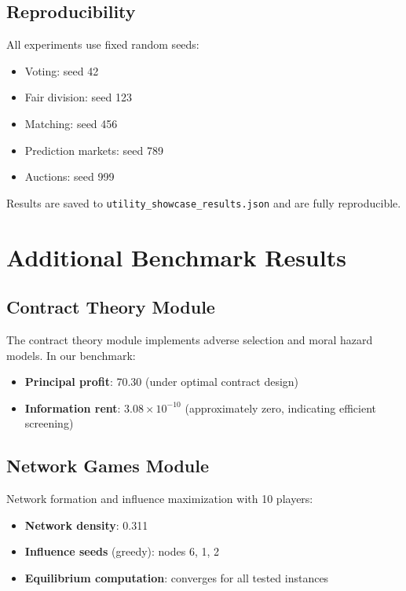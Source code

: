 \documentclass[10pt]{article}
\begin{document}
\subsection{Reproducibility}

All experiments use fixed random seeds:
\begin{itemize}[leftmargin=*,itemsep=1pt]
  \item Voting: seed 42
  \item Fair division: seed 123
  \item Matching: seed 456
  \item Prediction markets: seed 789
  \item Auctions: seed 999
\end{itemize}

Results are saved to \texttt{utility\_showcase\_results.json} and are fully reproducible.

\section{Additional Benchmark Results}
\label{app:prior}

\subsection{Contract Theory Module}

The contract theory module implements adverse selection and moral hazard models. In our benchmark:
\begin{itemize}[leftmargin=*,itemsep=1pt]
  \item \textbf{Principal profit}: 70.30 (under optimal contract design)
  \item \textbf{Information rent}: $3.08 \times 10^{-10}$ (approximately zero, indicating efficient screening)
\end{itemize}

\subsection{Network Games Module}

Network formation and influence maximization with 10 players:
\begin{itemize}[leftmargin=*,itemsep=1pt]
  \item \textbf{Network density}: 0.311
  \item \textbf{Influence seeds} (greedy): nodes 6, 1, 2
  \item \textbf{Equilibrium computation}: converges for all tested instances
\end{itemize}
\end{document}
